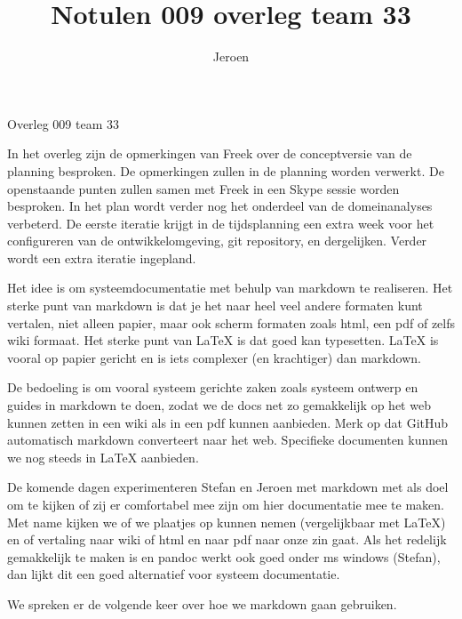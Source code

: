 \documentclass{article}
\title{Notulen 009 overleg team 33}
\author{Jeroen}
\begin{document}

\begin{Minutes}{Overleg 009 team 33}

\maketitle%


In het overleg zijn de opmerkingen van Freek over de conceptversie van de planning
besproken. De opmerkingen zullen in de planning worden verwerkt. De
openstaande punten zullen samen met Freek in een Skype sessie worden besproken.
In het plan wordt verder nog het onderdeel van de domeinanalyses verbeterd. De
eerste iteratie krijgt in de tijdsplanning een extra week voor het configureren
van de ontwikkelomgeving, git repository, en dergelijken. Verder wordt een extra
iteratie ingepland.


Het idee is om systeemdocumentatie met behulp van markdown te realiseren. 
Het sterke punt van markdown is dat je het naar
heel veel andere formaten kunt vertalen, niet alleen papier, maar ook scherm formaten
zoals html, een pdf of zelfs wiki formaat. Het sterke punt van LaTeX is dat
goed kan typesetten. LaTeX is vooral op papier gericht en is iets complexer (en krachtiger)
dan markdown. 

De bedoeling is om vooral systeem gerichte zaken zoals systeem ontwerp en guides
in markdown te doen, zodat we de docs net zo gemakkelijk op het web kunnen zetten
in een wiki als in een pdf kunnen aanbieden. Merk op dat GitHub automatisch
markdown converteert naar het web.
Specifieke documenten kunnen we nog steeds in LaTeX aanbieden.

De komende dagen experimenteren Stefan en Jeroen met markdown met als doel om
te kijken of zij er comfortabel mee zijn om hier documentatie mee te maken.
Met name kijken we of we plaatjes op kunnen nemen (vergelijkbaar met LaTeX) en 
of vertaling naar wiki of html en naar pdf naar onze zin gaat. Als het redelijk
gemakkelijk te maken is en pandoc werkt ook goed onder ms windows (Stefan), dan
lijkt dit een goed alternatief voor systeem documentatie.

We spreken er de volgende keer over hoe we markdown gaan gebruiken.



\end{Minutes}
\end{document}

